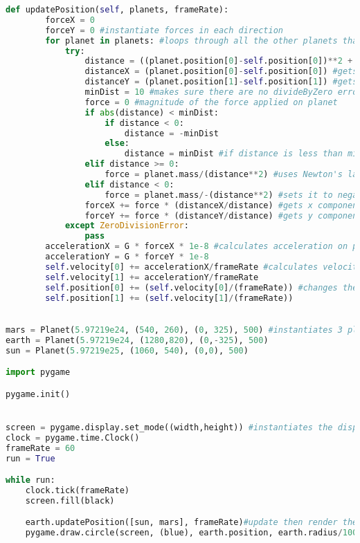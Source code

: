 \documentclass[12pt]{article}
\begin{document}
\begin{lstlisting}[language=Python]
    def updatePosition(self, planets, frameRate):
        forceX = 0
        forceY = 0 #instantiate forces in each direction
        for planet in planets: #loops through all the other planets that are not itself
            try:
                distance = ((planet.position[0]-self.position[0])**2 + (planet.position[1]-self.position[1])**2)**0.5 #calculates the distance from one planet to the next planet
                distanceX = (planet.position[0]-self.position[0]) #gets x component of distance
                distanceY = (planet.position[1]-self.position[1]) #gets y component of distance
                minDist = 10 #makes sure there are no divideByZero erros
                force = 0 #magnitude of the force applied on planet
                if abs(distance) < minDist:
                    if distance < 0:
                        distance = -minDist
                    else:
                        distance = minDist #if distance is less than minDist, then it sets it to minDist
                elif distance >= 0:
                    force = planet.mass/(distance**2) #uses Newton's law of gravitation to calculate force
                elif distance < 0:
                    force = planet.mass/-(distance**2) #sets it to negative if it's negative
                forceX += force * (distanceX/distance) #gets x component of force
                forceY += force * (distanceY/distance) #gets y component of force
            except ZeroDivisionError:
                pass
        accelerationX = G * forceX * 1e-8 #calculates acceleration on planet
        accelerationY = G * forceY * 1e-8
        self.velocity[0] += accelerationX/frameRate #calculates velocity on planet
        self.velocity[1] += accelerationY/frameRate
        self.position[0] += (self.velocity[0]/(frameRate)) #changes the position of the planet
        self.position[1] += (self.velocity[1]/(frameRate))

    
mars = Planet(5.97219e24, (540, 260), (0, 325), 500) #instantiates 3 planet objects
earth = Planet(5.97219e24, (1280,820), (0,-325), 500)
sun = Planet(5.97219e25, (1060, 540), (0,0), 500)

import pygame

pygame.init()


screen = pygame.display.set_mode((width,height)) #instantiates the display
clock = pygame.time.Clock()
frameRate = 60
run = True

while run:
    clock.tick(frameRate)
    screen.fill(black)

    earth.updatePosition([sun, mars], frameRate)#update then render the planet on each frame
    pygame.draw.circle(screen, (blue), earth.position, earth.radius/100)
    

\end{lstlisting}
\end{document}

